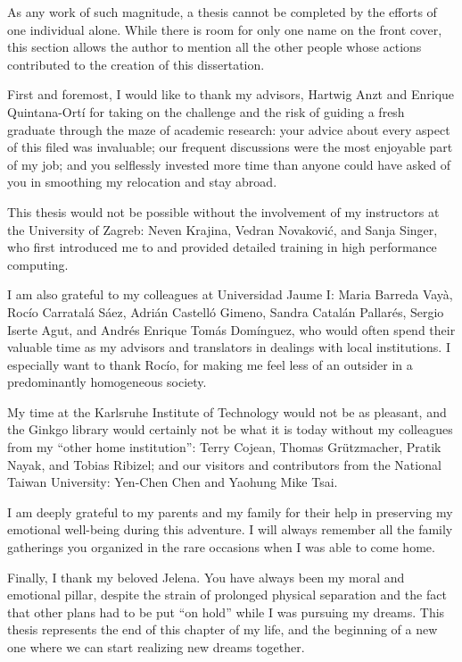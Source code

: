 As any work of such magnitude, a thesis cannot be completed by the efforts of
one individual alone. While there is room for only one name on the front cover,
this section allows the author to mention all the other people whose actions
contributed to the creation of this dissertation.

First and foremost, I would like to thank my advisors, Hartwig Anzt and Enrique
Quintana-Ort\'{i} for taking on the challenge and the risk of guiding a fresh
graduate through the maze of academic research: your advice about every aspect
of this filed was invaluable; our frequent discussions were the most enjoyable
part of my job; and you selflessly invested more time than anyone could have
asked of you in smoothing my relocation and stay abroad.

This thesis would not be possible without the involvement of my instructors at
the University of Zagreb: Neven Krajina, Vedran Novakovi\'{c}, and Sanja Singer,
who first introduced me to and provided detailed training in high performance
computing.

I am also grateful to my colleagues at Universidad Jaume I: Maria Barreda
Vay\`{a}, Roc\'{i}o Carratal\'{a} S\'{a}ez, Adri\'{a}n Castell\'{o} Gimeno,
Sandra Catal\'{a}n Pallar\'{e}s, Sergio Iserte Agut, and Andr\'{e}s Enrique
Tom\'{a}s Dom\'{i}nguez, who would often spend their valuable time as my
advisors and translators in dealings with local institutions. I especially want
to thank Roc\'{i}o, for making me feel less of an outsider in a predominantly
homogeneous society.

My time at the Karlsruhe Institute of Technology would not be as pleasant, and
the Ginkgo library would certainly not be what it is today without my colleagues
from my ``other home institution'': Terry Cojean, Thomas Gr\"{u}tzmacher, Pratik
Nayak, and Tobias Ribizel; and our visitors and contributors from the National
Taiwan University: Yen-Chen Chen and Yaohung Mike Tsai.

I am deeply grateful to my parents and my family for their help in preserving my
emotional well-being during this adventure. I will always remember all the
family gatherings you organized in the rare occasions when I was able to come
home.

Finally, I thank my beloved Jelena. You have always been my moral and emotional
pillar, despite the strain of prolonged physical separation and the fact that
other plans had to be put ``on hold'' while I was pursuing my dreams. This
thesis represents the end of this chapter of my life, and the beginning of a new
one where we can start realizing new dreams together.
